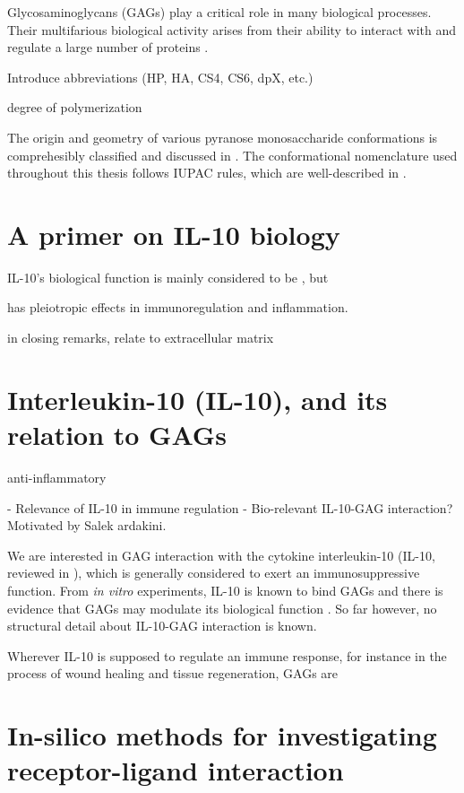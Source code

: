 Glycosaminoglycans (GAGs) play a critical role in many biological processes.
Their multifarious biological activity arises from their ability to interact
with and regulate a large number of proteins \cite{handel_2005}.

Introduce abbreviations (HP, HA, CS4, CS6, dpX, etc.)


degree of polymerization


The origin and geometry of various pyranose monosaccharide conformations is
comprehesibly classified and discussed in
\cite{classification_pyranose_conformers_1960}. The conformational nomenclature
used throughout this thesis follows IUPAC rules, which are well-described in
\cite{iupac_gag_conformations_1980}.


\section{A primer on IL-10 biology}

 IL-10's biological function is mainly considered to be
, but

 has pleiotropic effects in immunoregulation and
inflammation.


        in closing remarks, relate to extracellular matrix


\section{Interleukin-10 (IL-10), and its relation to GAGs}


 anti-inflammatory

- Relevance of IL-10 in immune regulation
- Bio-relevant IL-10-GAG interaction? Motivated by Salek ardakini.

We are interested in GAG interaction with the cytokine interleukin-10 (IL-10,
reviewed in \cite{moore_2001}), which is generally considered to exert an
immunosuppressive function. From \textit{in vitro} experiments, IL-10 is known
to bind GAGs and there is evidence that GAGs may modulate its biological
function \cite{salek_ardakani_2000}. So far however, no structural detail about
IL-10-GAG interaction is known.


Wherever IL-10 is supposed to
regulate an immune response, for instance in the process of wound healing and
tissue regeneration, GAGs are


\section{In-silico methods for investigating receptor-ligand interaction}

